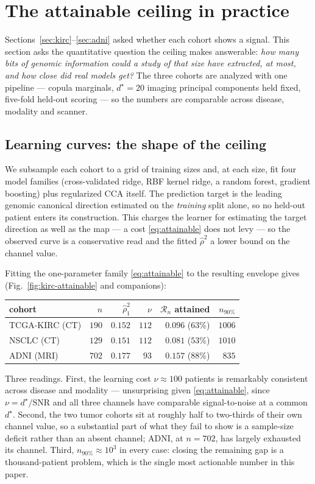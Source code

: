 \documentclass{article}
\begin{document}
\section{The attainable ceiling in practice}
\label{sec:attainable-cohorts}

Sections~\ref{sec:kirc}--\ref{sec:adni} asked whether each cohort shows a
signal. This section asks the quantitative question the ceiling makes
answerable: \emph{how many bits of genomic information could a study of that
size have extracted, at most, and how close did real models get?} The three
cohorts are analyzed with one pipeline --- copula marginals, $d^\star=20$
imaging principal components held fixed, five-fold held-out scoring --- so the
numbers are comparable across disease, modality and scanner.

\subsection{Learning curves: the shape of the ceiling}
\label{sec:attainable-curves}

We subsample each cohort to a grid of training sizes and, at each size, fit four
model families (cross-validated ridge, RBF kernel ridge, a random forest,
gradient boosting) plus regularized CCA itself. The prediction target is the
leading genomic canonical direction estimated on the \emph{training} split
alone, so no held-out patient enters its construction. This charges the learner
for estimating the target direction as well as the map --- a cost
\eqref{eq:attainable} does not levy --- so the observed curve is a conservative
read and the fitted $\hat\rho^2$ a lower bound on the channel value.

Fitting the one-parameter family \eqref{eq:attainable} to the resulting envelope
gives (Fig.~\ref{fig:kirc-attainable} and companions):
\begin{center}
\begin{tabular}{lrrrrr}
\toprule
cohort & $n$ & $\hat\rho_1^2$ & $\nu$ & $\mathcal{R}_n$ attained & $n_{90\%}$\\
\midrule
TCGA-KIRC (CT)  & $190$ & $0.152$ & $112$ & $0.096$ ($63\%$) & $1006$\\
NSCLC (CT)      & $129$ & $0.151$ & $112$ & $0.081$ ($53\%$) & $1010$\\
ADNI (MRI)      & $702$ & $0.177$ & $\phantom{0}93$ & $0.157$ ($88\%$) & $\phantom{0}835$\\
\bottomrule
\end{tabular}
\end{center}
Three readings. First, the learning cost $\nu\approx 100$ patients is
remarkably consistent across disease and modality --- unsurprising given
\eqref{eq:attainable}, since $\nu = d^\star/\mathrm{SNR}$ and all three channels
have comparable signal-to-noise at a common $d^\star$. Second, the two tumor
cohorts sit at roughly half to two-thirds of their own channel value, so a
substantial part of what they fail to show is a sample-size deficit rather than
an absent channel; ADNI, at $n=702$, has largely exhausted its channel. Third,
$n_{90\%}\approx 10^3$ in every case: closing the remaining gap is a
thousand-patient problem, which is the single most actionable number in this
paper.
\end{document}

